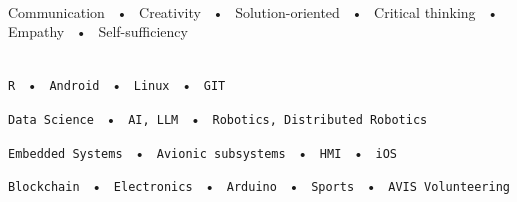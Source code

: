 \documentclass[lighthipster]{simplehipstercv}
\begin{document}
\begin{paracol}{2}
{        \bigskip
        
        \bigskip
        
        \\[0.5em]
        Communication ~•~ Creativity ~•~ Solution-oriented ~•~ Critical thinking ~•~ Empathy ~•~ Self-sufficiency

        \bigskip
        
        \\[0.5em]
        
        \texttt{R} ~•~ \texttt{Android} ~•~ \texttt{Linux} ~•~ \texttt{GIT}
        
        \texttt{Data Science} ~•~ \texttt{AI, LLM} ~•~ \texttt{Robotics, Distributed Robotics}
        
        \texttt{Embedded Systems} ~•~ \texttt{Avionic subsystems} ~•~ \texttt{HMI} ~•~ \texttt{iOS}

        \texttt{Blockchain} ~•~ \texttt{Electronics} ~•~ \texttt{Arduino} ~•~ \texttt{Sports} ~•~ \texttt{AVIS Volunteering} 
        
        \vspace{1em}
        
            
        
    }
    \switchcolumn %
    

    \begin{minipage}[t]{0.75\textwidth}

\end{minipage}
\end{paracol}
\end{document}

